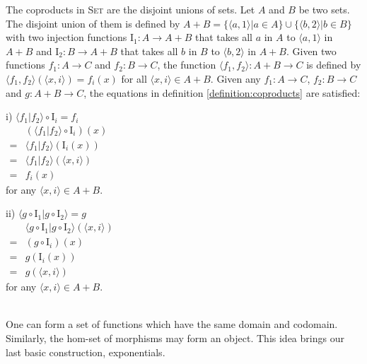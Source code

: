 The coproducts in \textsc{Set} are the disjoint unions of sets. Let $ A $ and $ B $ be two sets. The disjoint union of them is defined by $ A+B = \{ \langle a,1 \rangle | a \in A \} \cup \{ \langle b,2 \rangle | b \in B \} $ with two injection functions $ \text{I}_1 : A \to A+B $ that takes all $ a $ in $ A $ to $ \langle a,1 \rangle $ in $ A+B $ and $ \text{I}_2 : B \to A+B $ that takes all $ b $ in $ B $ to $ \langle b,2 \rangle $ in $ A+B $. Given two functions $ f_1 : A \to C $ and $ f_2 : B \to C $, the function $ \langle f_1 , f_2 \rangle : A+B \to C $ is defined by $ \langle f_1 , f_2 \rangle ( \langle x,i \rangle ) = f_i (x) $ for all $ \langle x,i \rangle \in A+B $. Given any $ f_1 : A \to C $, $ f_2 : B \to C $ and $ g: A+B \to C $, the equations in definition \ref{definition:coproducts} are satisfied:
\begin{myitemize}
\item[i)] $ \langle f_1 | f_2 \rangle \circ \text{I}_i = f_i $\\
$
\begin{array}{ll}
  & ( \langle f_1 | f_2 \rangle \circ \text{I}_i )(x)\\
= & \langle f_1 | f_2 \rangle ( \text{I}_i (x))\\
= & \langle f_1 | f_2 \rangle ( \langle x,i \rangle )\\
= & f_i (x)
\end{array}
$\\
for any $ \langle x,i \rangle \in A+B $.
\item[ii)] $ \langle g \circ \text{I}_1 | g \circ \text{I}_2 \rangle = g $\\
$
\begin{array}{ll}
  & \langle g \circ \text{I}_1 | g \circ \text{I}_2 \rangle ( \langle x,i \rangle )\\
= & ( g \circ \text{I}_i )(x)\\
= & g( \text{I}_i (x) )\\
= & g( \langle x,i \rangle )
\end{array}
$\\
for any $ \langle x,i \rangle \in A+B $.
\end{myitemize}
\mbox\\
\\
One can form a set of functions which have the same domain and codomain. Similarly, the hom-set of morphisms may form an object. This idea brings our last basic construction, exponentials.

